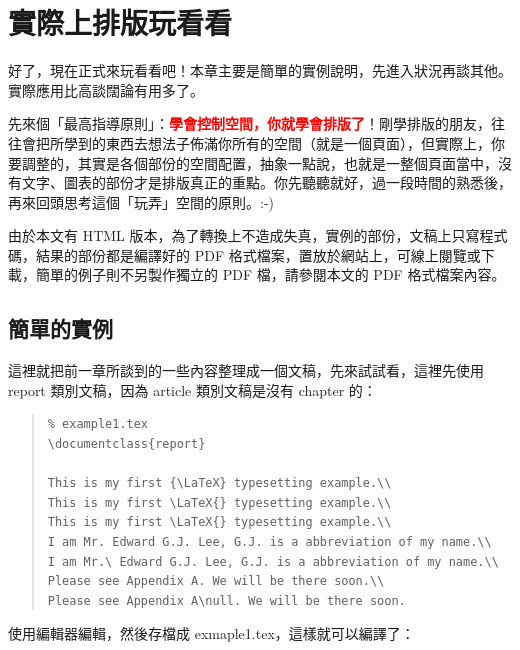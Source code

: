 
\chapter{實際上排版玩看看}
\label{ch:start}

好了，現在正式來玩看看吧！本章主要是簡單的實例說明，先進入狀況再談其他。實際應用比高談闊論有用多了。

先來個「最高指導原則」：\textcolor{red}{\bfseries 學會控制空間，你就學會排版了}！剛學排版的朋友，往往會把所學到的東西去想法子佈滿你所有的空間（就是一個頁面），但實際上，你要調整的，其實是各個部份的空間配置，抽象一點說，也就是一整個頁面當中，沒有文字、圖表的部份才是排版真正的重點。你先聽聽就好，過一段時間的熟悉後，再來回頭思考這個「玩弄」空間的原則。:-)

由於本文有 HTML 版本，為了轉換上不造成失真，實例的部份，文稿上只寫程式碼，結果的部份都是編譯好的 PDF 格式檔案，置放於網站上，可線上閱覽或下載，簡單的例子則不另製作獨立的 PDF 檔，請參閱本文的 PDF 格式檔案內容。

\section{簡單的實例}

這裡就把前一章所談到的一些內容整理成一個文稿，先來試試看，這裡先使用 {\ttfamily report} 類別文稿，因為 {\ttfamily article} 類別文稿是沒有 {\ttfamily chapter} 的：

\begin{quote}
   \begin{verbatim}
% example1.tex
\documentclass{report}

This is my first {\LaTeX} typesetting example.\\
This is my first \LaTeX{} typesetting example.\\
This is my first \LaTeX{} typesetting example.\\
I am Mr. Edward G.J. Lee, G.J. is a abbreviation of my name.\\
I am Mr.\ Edward G.J. Lee, G.J. is a abbreviation of my name.\\
Please see Appendix A. We will be there soon.\\
Please see Appendix A\null. We will be there soon.

\end{verbatim}
\end{quote}

使用編輯器編輯，然後存檔成 {\ttfamily exmaple1.tex}，這樣就可以編譯了：

